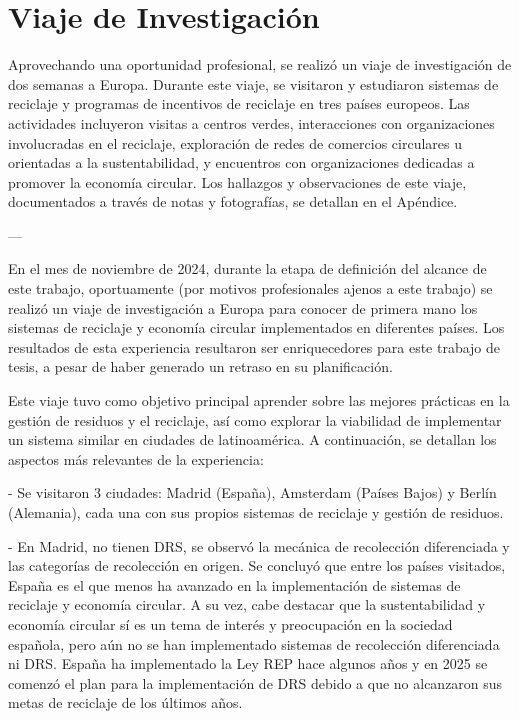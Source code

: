\chapter{Viaje de Investigación}
\label{cp:europe-trip}

Aprovechando una oportunidad profesional, se realizó un viaje de investigación de dos semanas a Europa.
Durante este viaje, se visitaron y estudiaron sistemas de reciclaje y programas de incentivos de reciclaje en tres países europeos.
Las actividades incluyeron visitas a centros verdes, interacciones con organizaciones involucradas en el reciclaje, exploración de redes de comercios circulares u orientadas a la sustentabilidad, y encuentros con organizaciones dedicadas a promover la economía circular.
Los hallazgos y observaciones de este viaje, documentados a través de notas y fotografías, se detallan en el Apéndice.

---

En el mes de noviembre de 2024, durante la etapa de definición del alcance de este trabajo, oportuamente (por motivos profesionales ajenos a este trabajo) se realizó un viaje de investigación a Europa para conocer de primera mano los sistemas de reciclaje y economía circular implementados en diferentes países. Los resultados de esta experiencia resultaron ser enriquecedores para este trabajo de tesis, a pesar de haber generado un retraso en su planificación.

Este viaje tuvo como objetivo principal aprender sobre las mejores prácticas en la gestión de residuos y el reciclaje, así como explorar la viabilidad de implementar un sistema similar en ciudades de latinoamérica. A continuación, se detallan los aspectos más relevantes de la experiencia:

- Se visitaron 3 ciudades: Madrid (España), Amsterdam (Países Bajos) y Berlín (Alemania), cada una con sus propios sistemas de reciclaje y gestión de residuos.

- En Madrid, no tienen DRS, se observó la mecánica de recolección diferenciada y las categorías de recolección en origen. Se concluyó que entre los países visitados, España es el que menos ha avanzado en la implementación de sistemas de reciclaje y economía circular. A su vez, cabe destacar que la sustentabilidad y economía circular sí es un tema de interés y preocupación en la sociedad española, pero aún no se han implementado sistemas de recolección diferenciada ni DRS. España ha implementado la Ley REP hace algunos años y en 2025 se comenzó el plan para la implementación de DRS debido a que no alcanzaron sus metas de reciclaje de los últimos años.


